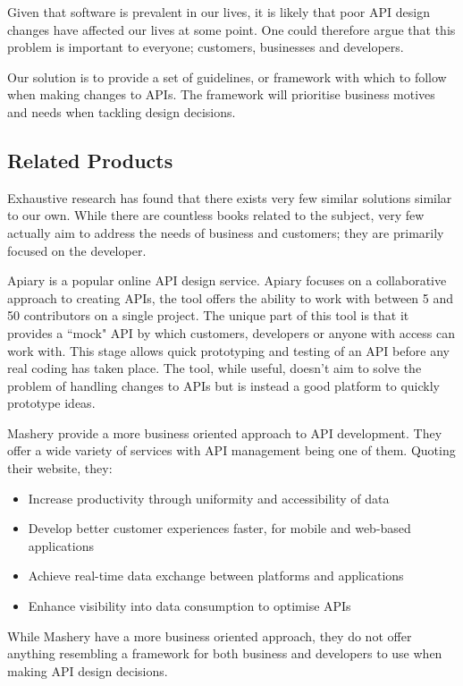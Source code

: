 \documentclass{article}
\begin{document}
Given that software is prevalent in our lives, it is likely that poor API design changes have affected our lives at some point. One could therefore argue that this problem is important to everyone; customers, businesses and developers.

Our solution is to provide a set of guidelines, or framework with which to follow when making changes to APIs. The framework will prioritise business motives and needs when tackling design decisions.

\subsection{Related Products}
Exhaustive research has found that there exists very few similar solutions similar to our own. While there are countless books related to the subject, very few actually aim to address the needs of business and customers; they are primarily focused on the developer.

Apiary \cite{Apiary} is a popular online API design service. Apiary focuses on a collaborative approach to creating APIs, the tool offers the ability to work with between 5 and 50 contributors on a single project. The unique part of this tool is that it provides a ``mock" API by which customers, developers or anyone with access can work with. This stage allows quick prototyping and testing of an API before any real coding has taken place. The tool, while useful, doesn't aim to solve the problem of handling changes to APIs but is instead a good platform to quickly prototype ideas.

Mashery \cite{Mashery} provide a more business oriented approach to API development. They offer a wide variety of services with API management being one of them. Quoting their website, they:

\begin{itemize}
\item Increase productivity through uniformity and accessibility of data
\item Develop better customer experiences faster, for mobile and web-based applications
\item Achieve real-time data exchange between platforms and applications
\item Enhance visibility into data consumption to optimise APIs
\end{itemize}

While Mashery have a more business oriented approach, they do not offer anything resembling a framework for both business and developers to use when making API design decisions.
\end{document}
